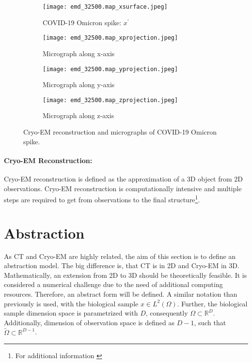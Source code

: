 \begin{figure}[H]
    \captionsetup[subfigure]{justification=centering}
    \centering
    \begin{subfigure}[t]{0.2\textwidth}
        \texttt{[image: emd\_32500.map\_xsurface.jpeg]}
        \caption{COVID-19 Omicron spike: $x^{\prime}$}
    \end{subfigure} \hfill
    \begin{subfigure}[t]{0.2\textwidth}
      \texttt{[image: emd\_32500.map\_xprojection.jpeg]}
      \caption{Micrograph along x-axis}
    \end{subfigure}\hfill
    \begin{subfigure}[t]{0.2\textwidth}
      \texttt{[image: emd\_32500.map\_yprojection.jpeg]}
      \caption{Micrograph along y-axis}
    \end{subfigure}\hfill
    \begin{subfigure}[t]{0.2\textwidth}
        \texttt{[image: emd\_32500.map\_zprojection.jpeg]}
        \caption{Micrograph along z-axis}
      \end{subfigure}
    \caption{Cryo-EM reconstruction and micrographs of COVID-19 Omicron spike\protect\footnotemark.}
    \label{fig:cryo-em-omicron}
  \end{figure}


\paragraph{Cryo-EM Reconstruction:}
Cryo-EM reconstruction is defined as the approximation of a 3D object from 2D observations.
Cryo-EM reconstruction is computationally intensive and multiple steps are required to get from 
observations to the final structure\footnote{For additional information \cite{singleParticleCryoEm, cryoEmMath}}.


\section{Abstraction}
As CT and Cryo-EM are highly related, the aim of this section is to define
an abstraction model. The big difference is, that CT is in 2D and Cryo-EM in 3D.
Mathematically, an extension from 2D to 3D should be theoretically feasible. 
It is considered a numerical challenge due to the need of additional computing resources.
Therefore, an abstract form will be defined.
A similar notation than previously is used, with the biological sample $x \in L^2(\Omega)$.
Further, the biological sample dimension space is parametrized with $D$, consequently $\Omega \subset \mathbb{R}^D$.
Additionally, dimension of observation space is defined as $D-1$, such that 
$\tilde{\Omega} \subset \mathbb{R}^{D-1}$.


